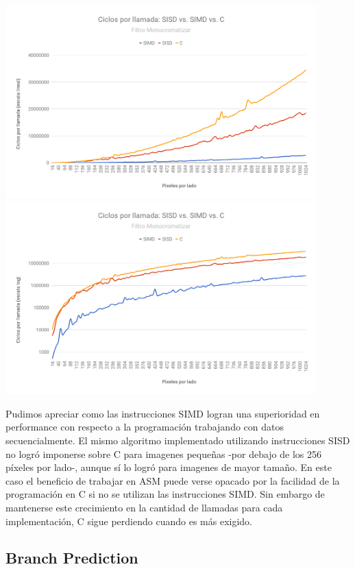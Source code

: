 \begin{center}

	\includegraphics[width=0.9\textwidth]{imagenes/simdsisd/SIMDvsSISDvsClin.png} \\
	\includegraphics[width=0.9\textwidth]{imagenes/simdsisd/SIMDvsSISDvsClog.png}

\end{center}

Pudimos apreciar como las instrucciones SIMD logran una superioridad en performance con respecto a la programación trabajando con datos secuencialmente. El mismo algoritmo implementado utilizando instrucciones SISD no logró imponerse sobre C para imagenes pequeñas -por debajo de los 256 píxeles por lado-, aunque sí lo logró para imagenes de mayor tamaño. En este caso el beneficio de trabajar en ASM puede verse opacado por la facilidad de la programación en C si no se utilizan las instrucciones SIMD. Sin embargo de mantenerse este crecimiento en la cantidad de llamadas para cada implementación, C sigue perdiendo cuando es más exigido.

\newpage
\subsection{Branch Prediction}

